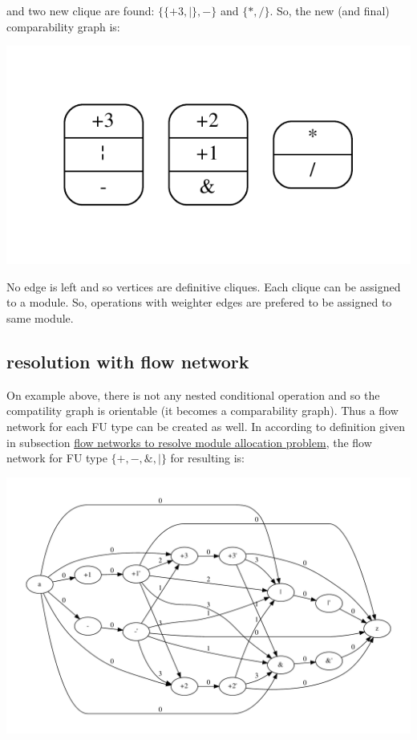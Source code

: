  and two new clique are found\+: $ \lbrace \lbrace +3, | \rbrace , - \rbrace $ and $ \lbrace *,/ \rbrace $. So, the new (and final) comparability graph is\+: 
\begin{DoxyImageNoCaption}
  \mbox{\includegraphics[width=\textwidth,height=\textheight/2,keepaspectratio=true]{dot_inline_dotgraph_17}}
\end{DoxyImageNoCaption}
 No edge is left and so vertices are definitive cliques. Each clique can be assigned to a module. So, operations with weighter edges are prefered to be assigned to same module.\hypertarget{src_HLS_module_binding_page_example_flow}{}\subsection{resolution with flow network}\label{src_HLS_module_binding_page_example_flow}
On example above, there is not any nested conditional operation and so the compatility graph is orientable (it becomes a comparability graph). Thus a flow network for each FU type can be created as well. In according to definition given in subsection \hyperlink{src_HLS_module_binding_page_flow_net}{flow networks to resolve module allocation problem}, the flow network for FU type $ \lbrace +,-,\&,\mid \rbrace $ for resulting is\+:


\begin{DoxyImageNoCaption}
  \mbox{\includegraphics[width=\textwidth,height=\textheight/2,keepaspectratio=true]{dot_inline_dotgraph_18}}
\end{DoxyImageNoCaption}


